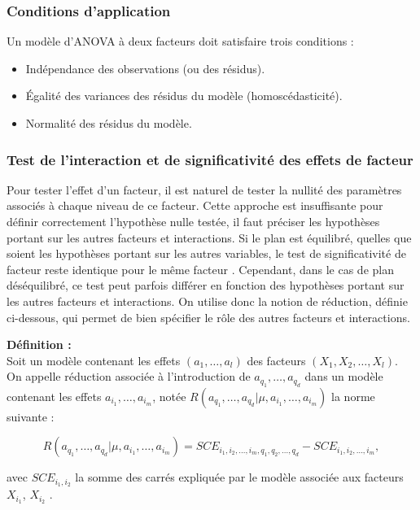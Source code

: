\documentclass[12pt,a4paper]{article}
\begin{document}
	\subsubsection{Conditions d'application}
	Un modèle d'ANOVA à deux facteurs doit satisfaire trois conditions \cite{maistre2023} :
	\begin{itemize}[label=$\bullet$]
		\item Indépendance des observations (ou des résidus).
		\item Égalité des variances des résidus du modèle (homoscédasticité).
		\item Normalité des résidus du modèle.
	\end{itemize}

	
	
	\subsubsection{Test de l'interaction et de significativité des effets de facteur}
	Pour tester l'effet d'un facteur, il est naturel de tester la nullité des paramètres associés à chaque niveau de ce facteur. Cette approche est insuffisante pour définir correctement l'hypothèse nulle testée, il faut préciser les hypothèses portant sur les autres facteurs et interactions. Si le plan est équilibré, quelles que soient les hypothèses portant sur les autres variables, le test de significativité de facteur reste identique pour le même facteur \cite{daudin}. Cependant, dans le cas de plan déséquilibré, ce test peut parfois différer en fonction des hypothèses portant sur les autres facteurs et interactions. On utilise donc la notion de réduction, définie ci-dessous, qui permet de bien spécifier le rôle des autres facteurs et interactions.\\
	
	\begin{mdframed} [backgroundcolor=gray!20, hidealllines=true, innermargin=10pt, outermargin=10pt, skipabove=10pt, skipbelow=10pt, nobreak=true]
		\textbf{Définition :}\\
			 Soit un modèle contenant les effets $(a_1,\ldots,a_l)$ des facteurs $(X_1, X_2, \ldots, X_l)$. On appelle réduction associée à l'introduction de $a_{q_1}, \ldots, a_{q_d}$ dans un modèle contenant les effets $a_{i_1}, \ldots, a_{i_m}$, notée $R(a_{q_1}, \ldots, a_{q_d}|\mu,a_{i_1}, \ldots, a_{i_m})$ la norme suivante : 
		
		\begin{equation}
			R(a_{q_1}, \ldots, a_{q_d}|\mu,a_{i_1}, \ldots, a_{i_m}) = SCE_{i_1,i_2,\ldots,i_m,q_1,q_2,\ldots,q_d} - SCE_{i_1,i_2,\ldots,i_m},
		\end{equation}
		
		avec $SCE_{i_1,i_2}$ la somme des carrés expliquée par le modèle associée aux facteurs $X_{i_1}$, $X_{i_2}$ \cite{daudin}.
	\end{mdframed}
	
\end{document}
